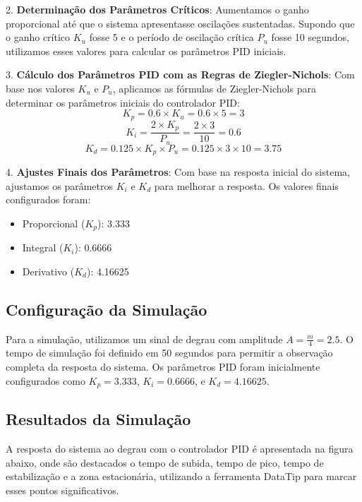 2. \textbf{Determinação dos Parâmetros Críticos}:
Aumentamos o ganho proporcional até que o sistema apresentasse oscilações sustentadas. Supondo que o ganho crítico \(K_u\) fosse 5 e o período de oscilação crítica \(P_u\) fosse 10 segundos, utilizamos esses valores para calcular os parâmetros PID iniciais.

3. \textbf{Cálculo dos Parâmetros PID com as Regras de Ziegler-Nichols}:
Com base nos valores \(K_u\) e \(P_u\), aplicamos as fórmulas de Ziegler-Nichols para determinar os parâmetros iniciais do controlador PID:
\[
    K_p = 0.6 \times K_u = 0.6 \times 5 = 3
\]
\[
    K_i = \frac{2 \times K_p}{P_u} = \frac{2 \times 3}{10} = 0.6
\]
\[
    K_d = 0.125 \times K_p \times P_u = 0.125 \times 3 \times 10 = 3.75
\]

4. \textbf{Ajustes Finais dos Parâmetros}:
Com base na resposta inicial do sistema, ajustamos os parâmetros \(K_i\) e \(K_d\) para melhorar a resposta. Os valores finais configurados foram:
\begin{itemize}
    \item Proporcional (\(K_p\)): 3.333
    \item Integral (\(K_i\)): 0.6666
    \item Derivativo (\(K_d\)): 4.16625
\end{itemize}

\subsection{Configuração da Simulação}
Para a simulação, utilizamos um sinal de degrau com amplitude \( A = \frac{m}{4} = 2.5 \). O tempo de simulação foi definido em 50 segundos para permitir a observação completa da resposta do sistema. Os parâmetros PID foram inicialmente configurados como \( K_p = 3.333 \), \( K_i = 0.6666 \), e \( K_d = 4.16625 \).

\subsection{Resultados da Simulação}
A resposta do sistema ao degrau com o controlador PID é apresentada na figura abaixo, onde são destacados o tempo de subida, tempo de pico, tempo de estabilização e a zona estacionária, utilizando a ferramenta DataTip para marcar esses pontos significativos.


